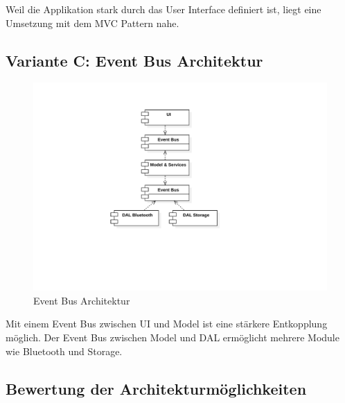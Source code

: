 Weil die Applikation stark durch das User Interface definiert ist, liegt eine Umsetzung mit dem MVC Pattern nahe.

\subsection{Variante C: Event Bus Architektur}
\begin{figure}[H]
    \begin{center}
        \includegraphics[trim=0 180 100 30,clip,width=\textwidth]{design/res/eventbus}
    \end{center}
    \caption{Event Bus Architektur}
\end{figure}

Mit einem Event Bus zwischen \ac{UI} und Model ist eine stärkere Entkopplung möglich\cite{fowler_event_collab}. Der Event Bus zwischen Model und \ac{DAL} ermöglicht mehrere Module wie Bluetooth und Storage.

\subsection{Bewertung der Architekturmöglichkeiten}

